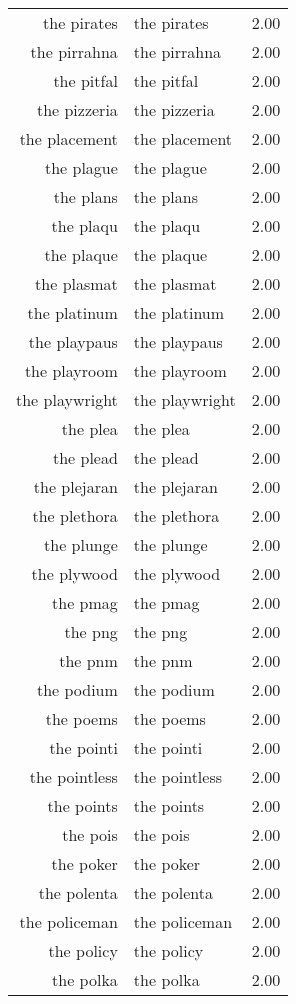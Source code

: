 \begin{table}[ht]
\begin{tabular}{rlr}
  the pirates & the pirates & 2.00 \\ 
  the pirrahna & the pirrahna & 2.00 \\ 
  the pitfal & the pitfal & 2.00 \\ 
  the pizzeria & the pizzeria & 2.00 \\ 
  the placement & the placement & 2.00 \\ 
  the plague & the plague & 2.00 \\ 
  the plans & the plans & 2.00 \\ 
  the plaqu & the plaqu & 2.00 \\ 
  the plaque & the plaque & 2.00 \\ 
  the plasmat & the plasmat & 2.00 \\ 
  the platinum & the platinum & 2.00 \\ 
  the playpaus & the playpaus & 2.00 \\ 
  the playroom & the playroom & 2.00 \\ 
  the playwright & the playwright & 2.00 \\ 
  the plea & the plea & 2.00 \\ 
  the plead & the plead & 2.00 \\ 
  the plejaran & the plejaran & 2.00 \\ 
  the plethora & the plethora & 2.00 \\ 
  the plunge & the plunge & 2.00 \\ 
  the plywood & the plywood & 2.00 \\ 
  the pmag & the pmag & 2.00 \\ 
  the png & the png & 2.00 \\ 
  the pnm & the pnm & 2.00 \\ 
  the podium & the podium & 2.00 \\ 
  the poems & the poems & 2.00 \\ 
  the pointi & the pointi & 2.00 \\ 
  the pointless & the pointless & 2.00 \\ 
  the points & the points & 2.00 \\ 
  the pois & the pois & 2.00 \\ 
  the poker & the poker & 2.00 \\ 
  the polenta & the polenta & 2.00 \\ 
  the policeman & the policeman & 2.00 \\ 
  the policy & the policy & 2.00 \\ 
  the polka & the polka & 2.00 \\ 

\end{tabular}
\end{table}

